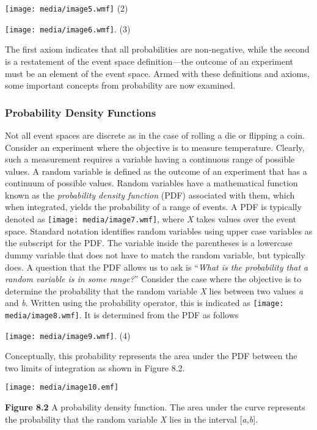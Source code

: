 \texttt{[image: media/image5.wmf]} (2)

\texttt{[image: media/image6.wmf]}. (3)

The first axiom indicates that all probabilities are non-negative, while
the second is a restatement of the event space definition---the outcome
of an experiment must be an element of the event space. Armed with these
definitions and axioms, some important concepts from probability are now
examined.

\subsubsection{Probability Density
Functions}\label{probability-density-functions}

Not all event spaces are discrete as in the case of rolling a die or
flipping a coin. Consider an experiment where the objective is to
measure temperature. Clearly, such a measurement requires a variable
having a continuous range of possible values. A random variable is
defined as the outcome of an experiment that has a continuum of possible
values. Random variables have a mathematical function known as the
\emph{probability density function} (PDF) associated with them, which
when integrated, yields the probability of a range of events. A PDF is
typically denoted as \texttt{[image: media/image7.wmf]}, where \emph{X}
takes values over the event space. Standard notation identifies random
variables using upper case variables as the subscript for the PDF. The
variable inside the parentheses is a lowercase dummy variable that does
not have to match the random variable, but typically does. A question
that the PDF allows us to ask is ``\emph{What is the probability that a
random variable is in some range?}'' Consider the case where the
objective is to determine the probability that the random variable
\emph{X} lies between two values \emph{a} and \emph{b}. Written using
the probability operator, this is indicated as
\texttt{[image: media/image8.wmf]}. It is determined from the PDF as
follows

\texttt{[image: media/image9.wmf]}. (4)

Conceptually, this probability represents the area under the PDF between
the two limits of integration as shown in Figure 8.2.

\texttt{[image: media/image10.emf]}

\textbf{Figure 8.2} A probability density function. The area under the
curve represents the probability that the random variable \emph{X} lies
in the interval {[}\emph{a,b}{]}.

